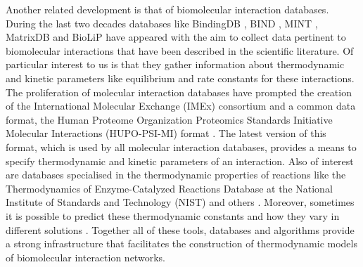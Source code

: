 Another related development is that of
biomolecular interaction databases.
During the last two decades
databases like BindingDB \citep{bindingdb,bindingdb15},
BIND \citep{bind}, MINT \citep{mint,mint12},
MatrixDB \citep{matrixdb09} and BioLiP \citep{biolip} have appeared
with the aim to collect data pertinent to biomolecular interactions
that have been described in the scientific literature.
Of particular interest to us is that they gather information
about thermodynamic and kinetic parameters
like equilibrium and rate constants for these interactions.
The proliferation of molecular interaction databases
have prompted the creation of
the International Molecular Exchange (IMEx) consortium \citep{imex}
and a common data format,
the Human Proteome Organization Proteomics Standards Initiative
Molecular Interactions (HUPO-PSI-MI) format
\citep{hupo-psi-mi-1,hupo-psi-mi-2.5}.
The latest version of this format,
which is used by all molecular interaction databases,
provides a means to specify
thermodynamic and kinetic parameters of an interaction.
%
Also of interest are databases
specialised in the thermodynamic properties of reactions like
the Thermodynamics of Enzyme-Catalyzed Reactions Database
at the National Institute of Standards and Technology (NIST)
\citep{tecrdb} and others \citep{biocoda-thermo}.
Moreover, sometimes it is possible to predict these %
thermodynamic constants and how they vary in different solutions
\citep{equilibrator,group-contrib}.
Together all of these tools, databases and algorithms
provide a strong infrastructure that facilitates the construction
of thermodynamic models of biomolecular interaction networks.

